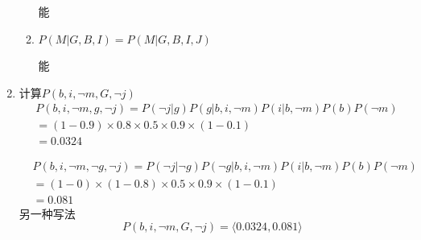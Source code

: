 \begin{example}
\begin{enumerate}
\begin{enumerate}
            能
            \item $P(M|G,B,I) = P(M|G,B,I,J)$
            
            能
        \end{enumerate}
        \item 计算$P(b,i,\lnot m,G,\lnot j)$
        \[
            \begin{array}{ll}
                &P(b,i,\lnot m,g,\lnot j) = P(\lnot j|g)P(g|b,i,\lnot m)P(i|b,\lnot m)P(b)P(\lnot m)\\
                &=(1-0.9)\times 0.8\times 0.5\times 0.9\times (1-0.1)\\
                &=0.0324
            \end{array}
        \]

        \[
            \begin{array}{ll}
                &P(b,i,\lnot m,\lnot g,\lnot j) = P(\lnot j|\lnot g)P(\lnot g|b,i,\lnot m)P(i|b,\lnot m)P(b)P(\lnot m)\\
                &=(1-0)\times (1-0.8)\times 0.5\times 0.9\times (1-0.1)\\
                &=0.081
            \end{array}
        \]
        另一种写法
        \[
            P(b,i,\lnot m,G,\lnot j) = \langle 0.0324,0.081 \rangle
        \]
    \end{enumerate}
\end{example}
